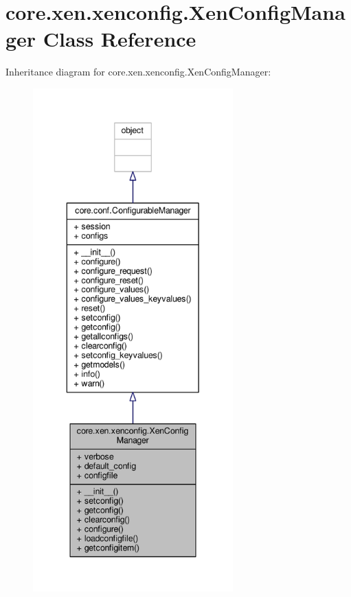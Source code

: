 \hypertarget{classcore_1_1xen_1_1xenconfig_1_1_xen_config_manager}{\section{core.\+xen.\+xenconfig.\+Xen\+Config\+Manager Class Reference}
\label{classcore_1_1xen_1_1xenconfig_1_1_xen_config_manager}
}


Inheritance diagram for core.\+xen.\+xenconfig.\+Xen\+Config\+Manager\+:
\nopagebreak
\begin{figure}[H]
\begin{center}
\leavevmode
\includegraphics[height=550pt]{classcore_1_1xen_1_1xenconfig_1_1_xen_config_manager__inherit__graph}
\end{center}
\end{figure}


